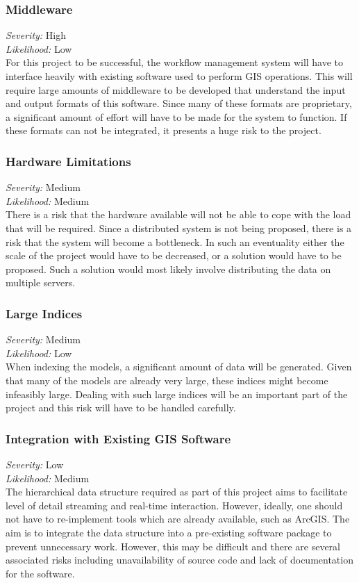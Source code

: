 \documentclass[12pt,a4paper]{article}
\begin{document}
\subsubsection*{Middleware}
\noindent \textit{Severity: } High \\
\noindent \textit{Likelihood: } Low \\
For this project to be successful, the workflow management system will have to interface
heavily with existing software used to perform GIS operations. This will
require large amounts of middleware to be developed that understand 
the input and output formats of this software. Since many of these
formats are proprietary, a significant amount of effort will have to
be made for the system to function. If these formats can not be integrated,
it presents a huge risk to the project.
\subsubsection*{Hardware Limitations}
\noindent \textit{Severity: } Medium \\
\noindent \textit{Likelihood: } Medium \\
There is a risk that the hardware available will not be able to cope
with the load that will be required. Since a distributed system is
not being proposed, there is a risk that the system will become a bottleneck. In
such an eventuality either the scale of the project would have to be decreased, or
a solution would have to be proposed. Such a solution would most likely involve
distributing the data on multiple servers.
\subsubsection*{Large Indices}
\noindent \textit{Severity: } Medium \\
\noindent \textit{Likelihood: } Low \\
When indexing the models, a significant amount of data will be generated.
Given that many of the models are already very large, these indices might
become infeasibly large. Dealing with such large indices will be an important
part of the project and this risk will have to be handled carefully.
\subsubsection*{Integration with Existing GIS Software}
\noindent \textit{Severity: } Low \\
\noindent \textit{Likelihood: } Medium \\
The hierarchical data structure required as part of this project aims to facilitate level
of detail streaming and real-time interaction. However, ideally, one should not have to
re-implement tools which are already available, such as ArcGIS. The aim is to integrate
the data structure into a pre-existing software package to prevent unnecessary work.
However, this may be difficult and there are several associated risks including
unavailability of source code and lack of documentation for the software.
\end{document}
